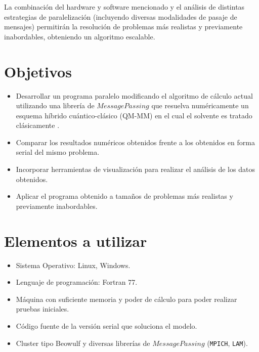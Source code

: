 \documentclass[a4paper, 12pt]{article}
\begin{document}
La combinaci\'on del hardware y software mencionado y el an\'alisis de distintas estrategias de paralelizaci\'on (incluyendo diversas modalidades de pasaje de mensajes) permitir\'an la resoluci\'on de problemas m\'as realistas y previamente inabordables, obteniendo un algoritmo escalable.


\section*{Objetivos}

\begin{itemize}
\item Desarrollar un programa paralelo modificando el algoritmo de c\'alculo actual utilizando una librer\'ia de $Message Passing$ que resuelva num\'ericamente un esquema h\'ibrido cu\'antico-cl\'asico (QM-MM) en el cual el solvente es tratado cl\'asicamente \cite{Nemukhin2002, Kesavan2003, lebrero2002}.

\item Comparar los resultados num\'ericos obtenidos frente a los obtenidos en forma serial del mismo problema.

\item Incorporar herramientas de visualizaci\'on para realizar el an\'alisis de los datos obtenidos.

\item Aplicar el programa obtenido a tama\~nos de problemas m\'as realistas y previamente inabordables.
\end{itemize}

\section*{Elementos a utilizar}

\begin{itemize}
\item Sistema Operativo: Linux, Windows.

\item Lenguaje de programaci\'on: Fortran 77.

\item M\'aquina con suficiente memoria y poder de c\'alculo para poder realizar pruebas iniciales.

\item C\'odigo fuente de la versi\'on serial que soluciona el modelo.

\item Cluster tipo Beowulf y diversas librer\'ias de $Message Passing$ (\texttt{MPICH}\cite{MPICH}, \texttt{LAM}\cite{LAM_MPI}).

\end{itemize}
\end{document}
